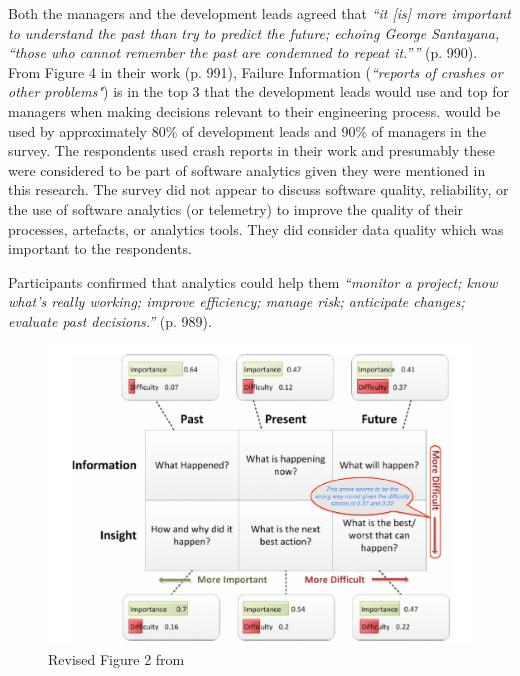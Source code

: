 Both the managers and the development leads agreed that \emph{``it [is] more important to understand the past than try to predict the future; echoing George Santayana, ``those who cannot remember the past are condemned to repeat it.''''} (p. 990). From Figure 4 in their work (p. 991), Failure Information (\emph{``reports of crashes or other problems"}) is in the top 3 that the development leads would use and top for managers when making decisions relevant to their engineering process.  would be used by approximately 80\% of development leads and 90\% of managers in the survey. The respondents used crash reports in their work and presumably these were considered to be part of software analytics given they were mentioned in this research. The survey did not appear to discuss software quality, reliability, or the use of software analytics (or telemetry) to improve the quality of their processes, artefacts, or analytics tools. They did consider data quality which was important to the respondents.

Participants confirmed that analytics could help them \emph{``monitor a project; know what's really working; improve efficiency; manage risk; anticipate changes; evaluate past decisions.''} (p. 989).

\begin{figure}
    \centering
    \includegraphics[width=\linewidth]{images/related-work/buse2012-edited-figure-2.pdf}
    \caption[Analytical questions, adapted from \cite{buse2012_information_needs_for_software_development_analytics}]{Revised Figure 2 from \cite{buse2012_information_needs_for_software_development_analytics}}
    \label{fig:buse2012-edited-figure-2}
\end{figure}

